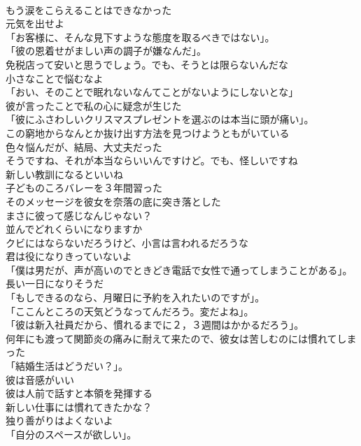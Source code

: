 \documentclass[8pt]{extreport}
\begin{document}
\begin{CJK}{UTF8}{min}
\\	もう涙をこらえることはできなかった	
\\	元気を出せよ	
\\	「お客様に、そんな見下すような態度を取るべきではない」。	
\\	「彼の恩着せがましい声の調子が嫌なんだ」。	
\\	免税店って安いと思うでしょう。でも、そうとは限らないんだな	
\\	小さなことで悩むなよ	
\\	「おい、そのことで眠れないなんてことがないようにしないとな」	
\\	彼が言ったことで私の心に疑念が生じた	
\\	「彼にふさわしいクリスマスプレゼントを選ぶのは本当に頭が痛い」。	
\\	この窮地からなんとか抜け出す方法を見つけようともがいている	
\\	色々悩んだが、結局、大丈夫だった	
\\	そうですね、それが本当ならいいんですけど。でも、怪しいですね	
\\	新しい教訓になるといいね	
\\	子どものころバレーを３年間習った	
\\	そのメッセージを彼女を奈落の底に突き落とした	
\\	まさに彼って感じなんじゃない？	
\\	並んでどれくらいになりますか	
\\	クビにはならないだろうけど、小言は言われるだろうな	
\\	君は役になりきっていないよ	
\\	「僕は男だが、声が高いのでときどき電話で女性で通ってしまうことがある」。	
\\	長い一日になりそうだ	
\\	「もしできるのなら、月曜日に予約を入れたいのですが」。	
\\	「ここんところの天気どうなってんだろう。変だよね」。	
\\	「彼は新入社員だから、慣れるまでに２，３週間はかかるだろう」。	
\\	何年にも渡って関節炎の痛みに耐えて来たので、彼女は苦しむのには慣れてしまった	
\\	「結婚生活はどうだい？」。	
\\	彼は音感がいい	
\\	彼は人前で話すと本領を発揮する	
\\	新しい仕事には慣れてきたかな？	
\\	独り善がりはよくないよ	
\\	「自分のスペースが欲しい」。	

\end{CJK}
\end{document}
